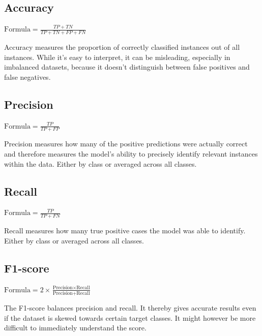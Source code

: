 \documentclass{article}
\begin{document}
\subsection{Accuracy}
$\text{Formula} = \frac{TP + TN}{TP + TN + FP + FN}$

Accuracy measures the proportion of correctly classified instances out of all instances. While it’s easy to interpret, it can be misleading, especially in imbalanced datasets, because it doesn't distinguish between false positives and false negatives.

\subsection{Precision}
$\text{Formula} = \frac{TP}{TP + FP}$

Precision measures how many of the positive predictions were actually correct and therefore measures the model’s ability to precisely identify relevant instances within the data. Either by class or averaged across all classes.

\subsection{Recall}
$\text{Formula} = \frac{TP}{TP + FN}$

Recall measures how many true positive cases the model was able to identify. Either by class or averaged
across all classes.

\subsection{F1-score}

$\text{Formula}  = 2 \times \frac{\text{Precision} \times \text{Recall}}{\text{Precision} + \text{Recall}}$

The F1-score balances precision and recall. It thereby gives accurate results even if the dataset is skewed towards certain target classes. It might however be more difficult to immediately understand the score.
\end{document}
